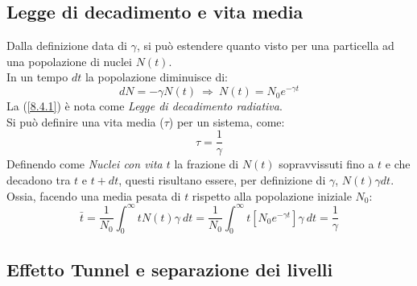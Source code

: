 \documentclass[twoside]{article}
\begin{document}
\vspace{0.5cm}

\subsection{Legge di decadimento e vita media}
Dalla definizione data di $\gamma$, si può estendere quanto visto per una particella ad una popolazione di nuclei $N(t)$.
\\
In un tempo $dt$ la popolazione diminuisce di:
\begin{equation} \label{8.4.1}
    dN=-\gamma N(t) \ \Rightarrow \ N(t)=N_0 e^{-\gamma t}
\end{equation}
La (\ref{8.4.1}) è nota come \textit{Legge di decadimento radiativa}.
\\
Si può definire una vita media ($\tau$) per un sistema, come:
\begin{equation}
    \tau=\frac{1}{\gamma}
\end{equation}
Definendo come \textit{Nuclei con vita $t$} la frazione di $N(t)$ sopravvissuti fino a $t$ e che decadono tra $t$ e $t+dt$, questi risultano essere, per definizione di $\gamma$, $N(t)\gamma dt$. Ossia, facendo una media pesata di $t$ rispetto alla popolazione iniziale $N_0$:
\begin{equation}
    \bar{t}=\frac{1}{N_0}\int_0 ^{\infty} tN(t)\gamma \ dt = \frac{1}{N_0} \int_0 ^{\infty} t[N_0 e^{-\gamma t}]\gamma \ dt= \frac{1}{\gamma}
\end{equation}

\vspace{0.5cm}

\subsection{Effetto Tunnel e separazione dei livelli}
\end{document}
